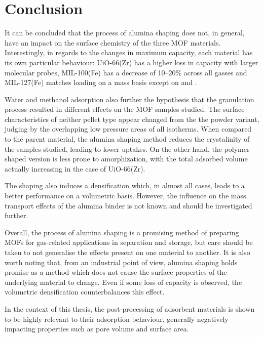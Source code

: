 
\pagebreak
\FloatBarrier%

\section{Conclusion}

It can be concluded that the process of alumina shaping does not, in 
general, have an impact on the surface chemistry of the three \gls{MOF}
materials. Interestingly, in regards to the changes in maximum capacity,
each material has its own particular behaviour: UiO-66(Zr) has a 
higher loss in capacity with larger molecular probes, MIL-100(Fe) 
has a decrease of 10--20\% across all gasses and MIL-127(Fe) matches
loading on a mass basis except on  and .

Water and methanol adsorption also further the hypothesis that 
the granulation process resulted in different
effects on the \gls{MOF} samples studied. The surface 
characteristics of neither pellet type appear changed from the 
the powder variant, judging by the overlapping low pressure
areas of all isotherms. When compared to the parent material,
the alumina shaping method reduces 
the crystalinity of the samples studied, leading to lower uptakes.
On the other hand, the polymer shaped version is less prone to
amorphization, with the total adsorbed volume actually increasing
in the case of UiO-66(Zr).

The shaping also induces a densification which, in almost all cases,
leads to a better performance on a volumetric basis. However, the 
influence on the mass transport effects of the alumina binder is 
not known and should be investigated further. 

Overall, the process of alumina shaping is a promising method of 
preparing \glspl{MOF} for gas-related applications in separation and 
storage, but care should be taken to not generalise the effects
present on one material to another. It is also worth noting that,
from an industrial point of view, alumina shaping holds promise 
as a method which does not cause the surface properties of 
the underlying material to change. Even if some loss of capacity
is observed, the volumetric densification counterbalances this effect. 

In the context of this thesis, the post-processing of adsorbent
materials is shown to be highly relevant to their adsorption behaviour,
generally negatively impacting properties such as pore volume and surface
area. 

\pagebreak
